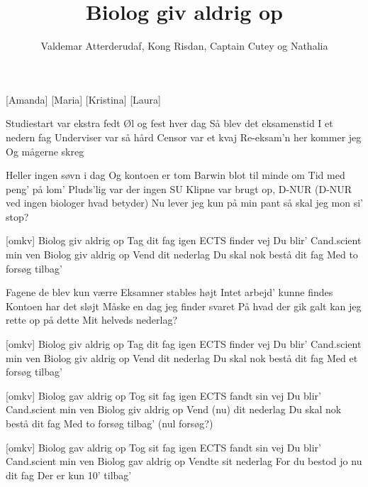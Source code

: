 \documentclass[a4paper,11pt]{article}
\title{Biolog giv aldrig op}
\author{Valdemar Atterderudaf, Kong Risdan, Captain Cutey og Nathalia}
\begin{document}
\maketitle

\begin{roles}
    [Amanda]
    [Maria]
    [Kristina]
    [Laura]
\end{roles}

\begin{song}
   Studiestart var ekstra fedt
Øl og fest hver dag
Så blev det eksamenstid
I et nedern fag
Underviser var så hård
Censor var et kvaj
Re-eksam’n her kommer jeg
Og mågerne skreg

Heller ingen søvn i dag 
Og kontoen er tom
Barwin blot til minde om
Tid med peng’ på lom’ 
Pluds’lig var der ingen SU
Klipne var brugt op, D-NUR (D-NUR ved ingen biologer hvad betyder) 
Nu lever jeg kun på min pant
så skal jeg mon si’ stop?


  [omkv] Biolog giv aldrig op 
Tag dit fag igen
ECTS finder vej 
Du blir’ Cand.scient min ven
Biolog giv aldrig op 
Vend dit nederlag 
Du skal nok bestå dit fag
Med to forsøg tilbag’

  Fagene de blev kun værre
Eksamner stables højt
Intet arbejd’ kunne findes
Kontoen har det sløjt
Måske en dag jeg finder svaret
På hvad der gik galt
kan jeg rette op på dette
Mit helveds nederlag?

[omkv] Biolog giv aldrig op 
Tag dit fag igen
ECTS finder vej 
Du blir’ Cand.scient min ven
Biolog giv aldrig op 
Vend dit nederlag 
Du skal nok bestå dit fag
Med et forsøg tilbag’

[omkv] Biolog gav aldrig op 
Tog sit fag igen
ECTS fandt sin vej 
Du blir’ Cand.scient min ven
Biolog giv aldrig op 
Vend (nu) dit nederlag 
Du skal nok bestå dit fag
Med to forsøg tilbag’ (nul forsøg?) 

[omkv] Biolog gav aldrig op 
Tog sit fag igen
ECTS fandt sin vej 
Du blir’ Cand.scient min ven
Biolog gav aldrig op 
Vendte sit nederlag 
For du bestod jo nu dit fag
Der er kun 10’ tilbag’

\end{song}
\end{document}
